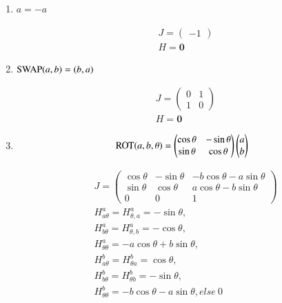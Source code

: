 \documentclass{article}
\newcommand{\<}{\langle}
\renewcommand{\>}{\rangle}
\theoremstyle{definition}\newtheorem{definition}{\textit{Definition}}
\begin{document}
\begin{multicols}{2}
\begin{enumerate}
\item $a = -a$

\begin{align*}
    &J = \left(\begin{matrix}
-1
\end{matrix}\right)\\
    &H = \mathbf{0}
\end{align*}

\item ${\rm SWAP}(a, b) = (b, a)$

\begin{align*}
    &J = \left(\begin{matrix}
0 & 1 \\
1 & 0
\end{matrix}\right)\\
    &H = \mathbf{0}
\end{align*}

\item \begin{align*}
{\rm ROT}(a, b, \theta)  = \left(\begin{matrix}
        \cos\theta & - \sin\theta\\
        \sin\theta  & \cos\theta
    \end{matrix}\right)
    \left(\begin{matrix}
        a\\
        b
    \end{matrix}\right)
\end{align*}

\begin{align*}
    &J = \left(\begin{matrix}
        \cos\theta & - \sin\theta & -b\cos\theta-a\sin \theta\\
        \sin\theta  & \cos\theta & a\cos\theta -b\sin\theta\\
        0 & 0 & 1
    \end{matrix}\right)\\
    &H^a_{a\theta} = H^a_{\theta, a} = -\sin\theta,\\
    &H^a_{b\theta} = H^a_{\theta, b} = -\cos\theta,\\
    &H^a_{\theta\theta} = -a\cos\theta + b\sin\theta,\\
    &H^b_{a\theta} = H^b_{\theta a} = \cos\theta,\\
    &H^b_{b\theta} = H^b_{\theta b} = -\sin\theta,\\
    &H^b_{\theta\theta} = -b\cos\theta-a\sin\theta, else ~0
\end{align*}
\end{enumerate}
\end{multicols}
\end{document}
